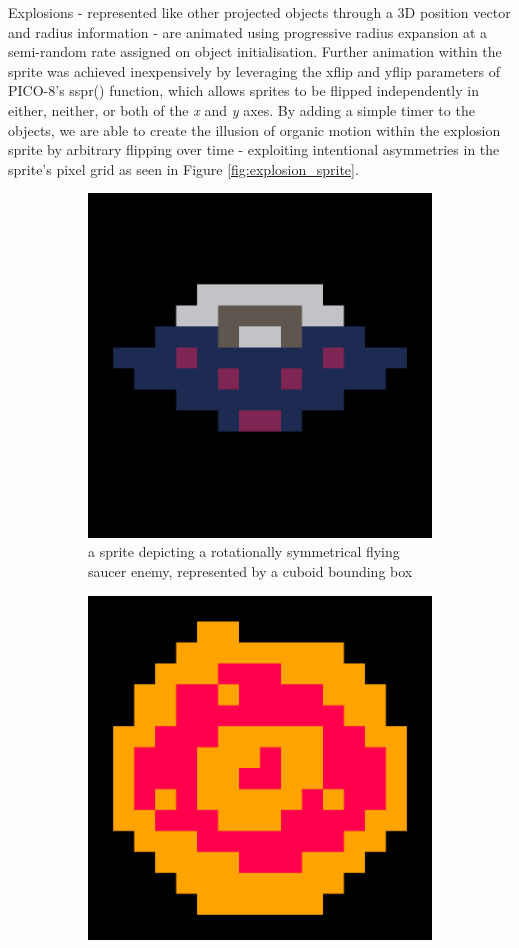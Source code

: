 \documentclass{article}
\begin{document}
Explosions - represented like other projected objects through a 3D position vector and radius information -
are animated using progressive radius expansion at a semi-random rate assigned on object initialisation.
Further animation within the sprite was achieved inexpensively by leveraging the xflip and yflip parameters
of PICO-8's sspr() function, which allows sprites to be flipped independently in either, neither, or both of the
\textit{x} and \textit{y} axes. By adding a simple timer to the objects, we are able to create the illusion of
organic motion within the explosion sprite by arbitrary flipping over time - exploiting intentional asymmetries
in the sprite's pixel grid as seen in Figure \ref{fig:explosion_sprite}.

\begin{figure}[h]
\begin{subfigure}{.45\textwidth}
  \centering
  \includegraphics[width=.8\linewidth]{ship_sprite}
  \caption{a sprite depicting a rotationally symmetrical flying saucer enemy, represented by a cuboid
  bounding box}
  \label{fig:saucer}
\end{subfigure}\hfill
\begin{subfigure}{.45\textwidth}
  \centering
  \includegraphics[width=.8\linewidth]{explosion_sprite}

\end{subfigure}
\end{figure}
\end{document}

